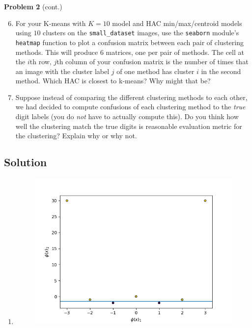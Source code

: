 \documentclass[submit]{harvardml}
\begin{document}
\newpage
\begin{framed}
\noindent\textbf{Problem 2} (cont.)\\
\begin{enumerate}
\setcounter{enumi}{5}
\item For your K-means with $K = 10$ model and HAC min/max/centroid
  models using $10$ clusters on the \texttt{small\_dataset} images,
  use the \texttt{seaborn} module's \texttt{heatmap} function to plot
  a confusion matrix between each pair of clustering methods.  This
  will produce 6 matrices, one per pair of methods. The cell at the
  $i$th row, $j$th column of your confusion matrix is the number of
  times that an image with the cluster label $j$ of one method has
  cluster $i$ in the second method.  Which HAC is closest to k-means?
  Why might that be?

\item Suppose instead of comparing the different clustering methods to
  each other, we had decided to compute confusions of each clustering
  method to the \emph{true} digit labels (you do \emph{not} have to
  actually compute this).  Do you think how well the clustering match
  the true digits is reasonable evaluation metric for the clustering?
  Explain why or why not.
  
\end{enumerate}
\end{framed}


\subsection*{Solution}
\begin{enumerate}
    \item 
        \begin{figure}[h!]
            \centering
            \includegraphics[height=0.4\textheight]{HW4/P1part8plot.png}
        \end{figure}

    
\end{enumerate}
\newpage
\end{document}
